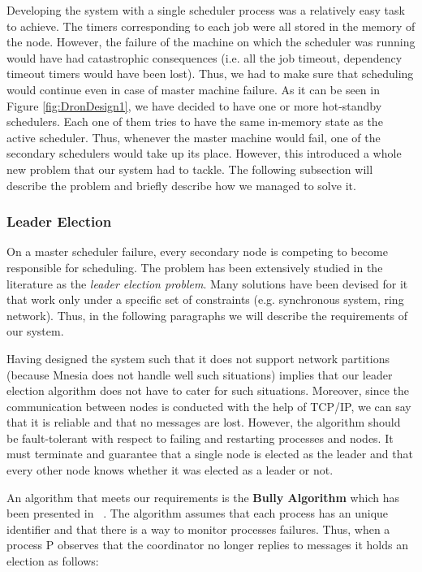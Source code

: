 \documentclass[11pt,a4paper,twoside]{report}
\begin{document}
Developing the system with a single scheduler process was a relatively easy task to achieve. The timers corresponding to each job were all stored in the memory of the node. However, the failure of the machine on which the scheduler was running would have had catastrophic consequences (i.e. all the job timeout, dependency timeout timers would have been lost). Thus, we had to make sure that scheduling would continue even in case of master machine failure. As it can be seen in Figure \ref{fig:DronDesign1}, we have decided to have one or more hot-standby schedulers. Each one of them tries to have the same in-memory state as the active scheduler. Thus, whenever the master machine would fail, one of the secondary schedulers would take up its place. However, this introduced a whole new problem that our system had to tackle. The following subsection will describe the problem and briefly describe how we managed to solve it.


\subsubsection{Leader Election}
On a master scheduler failure, every secondary node is competing to become responsible for scheduling. The problem has been extensively studied in the literature as the \textit{leader election problem}. Many solutions have been devised for it that work only under a specific set of constraints (e.g. synchronous system, ring network). Thus, in the following paragraphs we will describe the requirements of our system.


Having designed the system such that it does not support network partitions (because Mnesia does not handle well such situations) implies that our leader election algorithm does not have to cater for such situations. Moreover, since the communication between nodes is conducted with the help of TCP/IP, we can say that it is reliable and that no messages are lost. However, the algorithm should be fault-tolerant with respect to failing and restarting processes and nodes. It must terminate and guarantee that a single node is elected as the leader and that every other node knows whether it was elected as a leader or not.


An algorithm that meets our requirements is the \textbf{Bully Algorithm} which has been presented in ~\cite{LeaderElection1, LeaderElection2}. The algorithm assumes that each process has an unique identifier and that there is a way to monitor processes failures. Thus, when a process P observes that the coordinator no longer replies to messages it holds an election as follows: 
\end{document}
